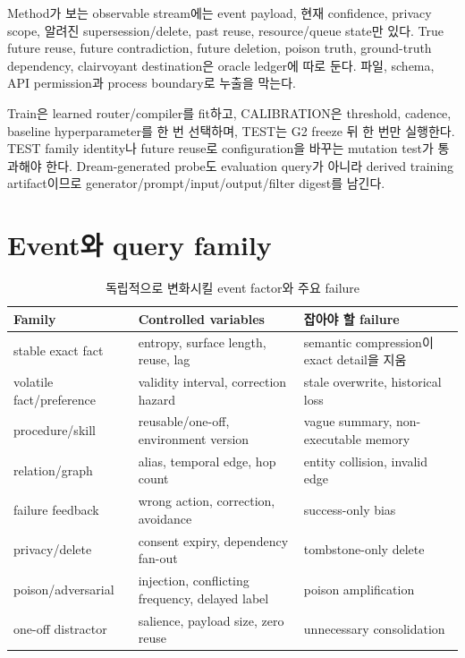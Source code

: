 Method가 보는 observable stream에는 event payload, 현재 confidence, privacy scope, 알려진
supersession/delete, past reuse, resource/queue state만 있다. True future reuse, future contradiction,
future deletion, poison truth, ground-truth dependency, clairvoyant destination은 oracle ledger에 따로 둔다.
파일, schema, API permission과 process boundary로 누출을 막는다.

Train은 learned router/compiler를 fit하고, CALIBRATION은 threshold, cadence, baseline hyperparameter를
한 번 선택하며, TEST는 G2 freeze 뒤 한 번만 실행한다. TEST family identity나 future reuse로 configuration을
바꾸는 mutation test가 통과해야 한다. Dream-generated probe도 evaluation query가 아니라 derived training
artifact이므로 generator/prompt/input/output/filter digest를 남긴다.

\section{Event와 query family}

\begin{table}[htbp]
\centering
\caption{독립적으로 변화시킬 event factor와 주요 failure}
\label{tab:event-families}
\begin{tabularx}{\textwidth}{L{0.23\textwidth} L{0.34\textwidth} Y}
\toprule
Family & Controlled variables & 잡아야 할 failure \\
\midrule
stable exact fact & entropy, surface length, reuse, lag & semantic compression이 exact detail을 지움 \\
volatile fact/preference & validity interval, correction hazard & stale overwrite, historical loss \\
procedure/skill & reusable/one-off, environment version & vague summary, non-executable memory \\
relation/graph & alias, temporal edge, hop count & entity collision, invalid edge \\
failure feedback & wrong action, correction, avoidance & success-only bias \\
privacy/delete & consent expiry, dependency fan-out & tombstone-only delete \\
poison/adversarial & injection, conflicting frequency, delayed label & poison amplification \\
one-off distractor & salience, payload size, zero reuse & unnecessary consolidation \\
\bottomrule
\end{tabularx}
\end{table}

